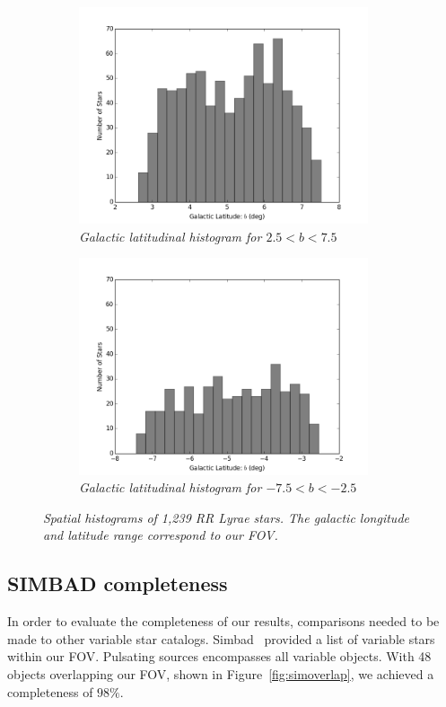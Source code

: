 \documentclass[aps,prb,twocolumn,superscriptaddress]{revtex4-1}
\begin{document}
\begin{figure}
	\begin{subfigure}{.5\textwidth}
	  \centering
	  \includegraphics[width=3.35in]{figures/PlotsSpace15/bphist_limit15.png}
		\caption{\it \small{Galactic latitudinal histogram for $2.5 < b < 7.5$}}
		\label{fig:bphist}
	\end{subfigure}%
	\begin{subfigure}{.5\textwidth}
	  \centering
			\includegraphics[width=3.35in]{figures/PlotsSpace15/bnhist_limit15.png}
		\caption{\it \small{Galactic latitudinal histogram for $-7.5 < b < -2.5$}}
		\label{fig:bnhist}
	\end{subfigure}%
	\caption{\it \small{Spatial histograms of 1,239 RR Lyrae stars. The galactic longitude and latitude range correspond to our FOV.}}
	\label{fig:blhist}
\end{figure}




\subsection{SIMBAD completeness}

In order to evaluate the completeness of our results, comparisons needed to be made to other variable star catalogs.  Simbad~\cite{simbad} provided a list of variable stars within our FOV.  Pulsating sources encompasses all variable objects.  With 48 objects overlapping our FOV, shown in Figure~\ref{fig:simoverlap}, we achieved a completeness of $98\%$.
\end{document}
